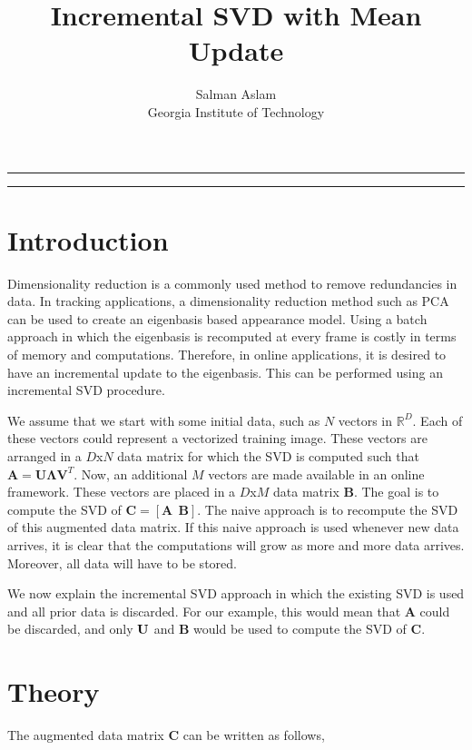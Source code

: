 
\title{Incremental SVD with Mean Update}
\author{Salman Aslam\\ Georgia Institute of Technology}

\maketitle
\rule[0pt]{\textwidth}{1pt}
\tableofcontents
\rule[0pt]{\textwidth}{1pt}
\section{Introduction}
Dimensionality reduction is a commonly used method to remove redundancies in data.  In tracking applications, a dimensionality reduction method such as PCA can be used to create an eigenbasis based appearance model.  Using a batch approach in which the eigenbasis is recomputed at every frame is costly in terms of memory and computations.  Therefore, in online applications, it is desired to have an incremental update to the eigenbasis.  This can be performed using an incremental SVD procedure.

We assume that we start with some initial data, such as $N$ vectors in $\mathbb{R}^D$.  Each of these vectors could represent a vectorized training image.  These vectors are arranged in a $D$x$N$ data matrix for which the SVD is computed such that $\mathbf{A}=\mathbf{U}\mathbf{\Lambda}\mathbf{V}^T$.  Now, an additional $M$ vectors are made available in an online framework.  These vectors are placed in a $D$x$M$ data matrix $\mathbf{B}$.  The goal is to compute the SVD of $\mathbf{C} = [\mathbf{A} \ \ \mathbf{B}]$.  The naive approach is to recompute the SVD of this augmented data matrix.  If this naive approach is used whenever new data arrives, it is clear that the computations will grow as more and more data arrives.  Moreover, all data will have to be stored.

We now explain the incremental SVD approach in which the existing SVD is used and all prior data is discarded.  For our example, this would mean that $\mathbf{A}$ could be discarded, and only ${\color{darkgreen}}\mathbf{U}$ and $\mathbf{B}$ would be used to compute the SVD of $\mathbf{C}$.

\section{Theory}
The augmented data matrix $\mathbf{C}$ can be written as follows,

